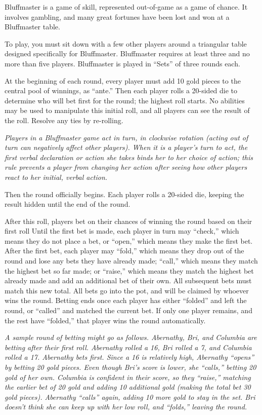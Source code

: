 \documentclass[green]{Kos}
\begin{document}
\name{\gBluffmaster{}}

Bluffmaster is a game of skill, represented out-of-game as a game of chance. It involves gambling, and many great fortunes have been lost and won at a Bluffmaster table.

To play, you must sit down with a few other players around a triangular table designed specifically for Bluffmaster. Bluffmaster requires at least three and no more than five players. Bluffmaster is played in ``Sets'' of three rounds each.

At the beginning of each round, every player must add 10 gold pieces to the central pool of winnings, as ``ante.'' Then each player rolls a 20-sided die to determine who will bet first for the round; the highest roll starts. No abilities may be used to manipulate this initial roll, and all players can see the result of the roll. Resolve any ties by re-rolling.

\emph{Players in a Bluffmaster game act in turn, in clockwise rotation (acting out of turn can negatively affect other players). When it is a player's turn to act, the first verbal declaration or action she takes binds her to her choice of action; this rule prevents a player from changing her action after seeing how other players react to her initial, verbal action.}

Then the round officially begins. Each player rolls a 20-sided die, keeping the result hidden until the end of the round. 

After this roll, players bet on their chances of winning the round based on their first roll Until the first bet is made, each player in turn may ``check,'' which means they do not place a bet, or ``open,'' which means they make the first bet. After the first bet, each player may ``fold,'' which means they drop out of the round and lose any bets they have already made; ``call,'' which means they match the highest bet so far made; or ``raise,'' which means they match the highest bet already made and add an additional bet of their own. All subsequent bets must match this new total. All bets go into the pot, and will be claimed by whoever wins the round. Betting ends once each player has either ``folded'' and left the round, or ``called'' and matched the current bet. If only one player remains, and the rest have ``folded,'' that player wins the round automatically.

\emph{A sample round of betting might go as follows. Abernathy, Bri, and Columbia are betting after their first roll. Abernathy rolled a 16, Bri rolled a 7, and Columbia rolled a 17. Abernathy bets first. Since a 16 is relatively high, Abernathy ``opens'' by betting 20 gold pieces. Even though Bri's score is lower, she ``calls,'' betting 20 gold of her own. Columbia is confident in their score, so they ``raise,'' matching the earlier bet of 20 gold and adding 10 additional gold (making the total bet 30 gold pieces). Abernathy ``calls'' again, adding 10 more gold to stay in the set. Bri doesn't think she can keep up with her low roll, and ``folds,'' leaving the round.}
\end{document}
